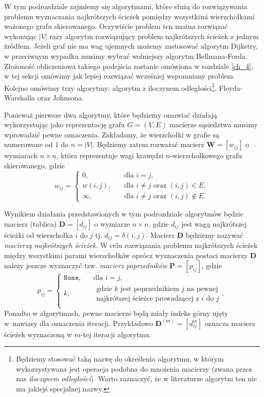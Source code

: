 \documentclass[12pt,a4paper]{book}
\theoremstyle{definition}
\numberwithin{equation}{chapter}
\begin{document}
W tym podrozdziale zajmiemy się algorytmami, które służą do rozwiązywania problemu wyznaczania najkrótszych ścieżek pomiędzy wszystkimi wierzchołkami ważonego grafu skierowanego. Oczywiście problem ten można rozwiązać wykonując $|V|$ razy algorytm rozwiązujący problem najkrótszych ścieżek z jednym źródłem. Jeżeli graf nie ma wag ujemnych możemy zastosować algorytm Dijkstry, w przeciwnym wypadku musimy wybrać wolniejszy algorytm Bellmana-Forda. Złożoność obliczeniowa takiego podejścia zostanie omówiona w rozdziale \ref{ch_4}, w tej sekcji omówimy jak lepiej rozwiązać wcześniej wspomniany problem. Kolejno omówimy trzy algorytmy: algorytm z iloczynem odległości\footnote{Będziemy stosować taką nazwę do określenia algorytmu, w którym wykorzystywana jest operacja podobna do mnożenia macierzy (zwana przez nas \textit{iloczynem odległości}). Warto zaznaczyć, że w literaturze algorytm ten nie ma jakiejś specjalnej nazwy.}, Floyda-Warshalla oraz Johnsona. 

Ponieważ pierwsze dwa algorytmy, które będziemy omawiać działają wykorzystując jako reprezentację grafu $G = (V,E)$ macierze sąsiedztwa musimy wprowadzić pewne oznaczenia. Zakładamy, że wierzchołki w grafie są numerowane od $1$ do $n = |V|$. Będziemy zatem rozważać macierz $\mathbf{W} = [w_{ij}]$ o wymiarach $n\times n$, która reprezentuje wagi krawędzi $n$-wierzchołkowego grafu skierowanego, gdzie
$$
w_{ij}=\left\{
\begin{array}{ll}
0,&\quad \mbox{dla $i = j$},\\
w(i,j),&\quad \mbox{dla $i \neq j$ oraz $(i,j)\in E$},\\
\infty,&\quad \mbox{dla $i \neq j$ oraz $(i,j)\notin E$}.
\end{array}\right.
$$

Wynikiem działania przedstawionych w tym podrozdziale algorytmów będzie macierz (tablica) $\mathbf{D}= [d_{ij}]$ o wymiarze $n\times n$, gdzie $d_{ij}$ jest wagą najkrótszej ścieżki od wierzchołka $i$ do $j$ tj. $d_{ij} = \delta(i,j)$. Macierz $\mathbf{D}$ będziemy nazywać \textit{macierzą najkrótszych ścieżek}. W celu rozwiązania problemu najkrótszych ścieżek między wszystkimi parami wierzchołków oprócz wyznaczenia postaci macierzy $\mathbf{D}$ należy jeszcze wyznaczyć tzw. \textit{macierz poprzedników} $\mathbf{P}= [p_{ij}]$, gdzie
$$
p_{ij}=\left\{
\begin{array}{ll}
\texttt{None},&\quad \mbox{dla $i = j$},\\
k,&\quad \begin{array}{l}
\mbox{gdzie $k$ jest poprzednikiem $j$ na pewnej}\\
\mbox{najkrótszej ścieżce prowadzącej z $i$ do $j$}
\end{array}.\\
\end{array}\right.
$$
Ponadto w algorytmach, pewne macierze będą miały indeks górny ujęty w~nawiasy dla oznaczenia iteracji. Przykładowo $\mathbf{D}^{(m)} = [d_{ij}^{m}]$ oznacza macierz ścieżek wyznaczoną w $m$-tej iteracji algorytmu.
\end{document}
